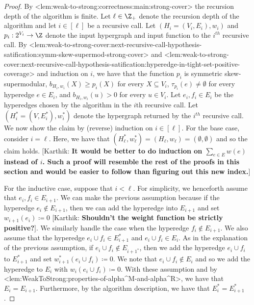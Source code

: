 \documentclass{article}
\def\Cref#1{<#1>}%
\newcommand{\knote}[1]{{\color{red}[{\tiny Karthik: \bf #1}]\marginpar{\color{red}*}}}
\begin{document}
\iffalse
\begin{proof}
    By \Cref{lem:weak-to-strong:correctness:main:strong-cover} the recursion depth of the algorithm is finite. Let $\ell \in \Z_+$ denote the recursion depth of the algorithm and let $i \in [\ell]$ be a recursive call. Let $(H_i = (V_i, E_i), w_i)$ and $p_i:2^{V_i}\rightarrow\Z$ denote the input hypergraph and input function to the $i^{th}$ recursive call. By \Cref{lem:weak-to-strong-cover:next-recursive-call-hypothesis-satification:symm-skew-supermod-strong-cover} and \Cref{lem:weak-to-strong-cover:next-recursive-call-hypothesis-satification:hyperedge-in-tight-set-positive-coverage} and induction on $i$, we have that the function $p_i$ is symmetric skew-supermodular, $b_{H_i, w_i}(X) \geq p_i(X)$ for every $X \subseteq V_i$, $\tau_{p_i}(e)\neq \emptyset$ for every hyperedge $e\in E_i$, and $b_{H_i, w_i}(u) > 0$ for every $u \in V_i$. Let $e_i, f_i\in E_i$ be the hyperedges chosen by the algorithm in the $i$th recursive call. Let $(H_i^*=(V, E_i^*), w_i^*)$ denote the hypergraph returned by the $i^{th}$ recursive call. We now show the claim by (reverse) induction on $i \in [\ell]$. For the base case, consider $i = \ell$. Here, we have that $(H_\ell^*, w_\ell^*) = (H_\ell, w_\ell) = (\emptyset, \emptyset)$ and so the claim holds. \knote{It would be better to do induction on  $\sum_{e\in E}w(e)$ instead of $i$. Such a proof will resemble the rest of the proofs in this section and would be easier to follow than figuring out this new index.} 
    
    For the inductive case, suppose that $i < \ell$.
    For simplicity, we henceforth assume that  $e_i, f_i \in E_{i+1}$. We can make the previous assumption because if the hyperedge $e_i \not \in E_{i+1}$, then we can add the hyperedge into $E_{i+1}$ and set $w_{i+1}(e_i) \coloneqq  0$ \knote{Shouldn't the weight function be strictly positive?}. We similarly handle the case when the hyperedge $f_i \not \in E_{i+1}$. We also assume that the hyperedge $e_{i} \cup f_i \in E_{i+1}^*$ and $e_{i} \cup f_i \in E_{i}$. As in the explanation of the previous assumption, if $e_i\cup f_i \not \in E_{i+1^*}$, then we add the hyperedge $e_i \cup f_i$ to $E^*_{i+1}$ and set $w^*_{i+1}(e_i\cup f_i) \coloneqq  0$. We note that $e_{i}\cup f_i \not \in E_i$ and so we add the hyperedge to $E_i$ with $w_i(e_i\cup f_i) \coloneqq  0$. With these assumption and by \Cref{lem:WeakToStrong:properties-of-alpha^M-and-alpha^R}, we have that $E_i = E_{i+1}$. Furthermore, by the algorithm description, we have that  $E_{i}^* = E_{i+1}^*$.


\end{proof}
\end{document}
